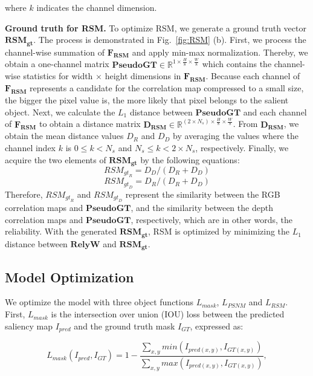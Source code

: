 \documentclass[runningheads]{llncs}
\begin{document}
	\noindent where $k$ indicates the channel dimension. 
	
	\noindent
	\textbf{Ground truth for RSM.} To optimize RSM, we generate a ground truth vector $\mathbf{RSM_{gt}}$. The process is demonstrated in Fig.~\ref{fig:RSM} (b). First, we process the channel-wise summation of $\mathbf{F_{RSM}}$ and apply min-max normalization. Thereby, we obtain a one-channel matrix $\mathbf{PseudoGT}\in \mathbb{R} ^ {1\times \frac{ H } { 8 } \times \frac{ W } { 8 }}$ which contains the channel-wise statistics for width $\times$ height dimensions in $\mathbf{F_{RSM}}$. Because each channel of $\mathbf{F_{RSM}}$ represents a candidate for the correlation map compressed to a small size, the bigger the pixel value is, the more likely that pixel belongs to the salient object. Next, we calculate the $L_1$ distance between $\mathbf{PseudoGT}$ and each channel of $\mathbf{F_{RSM}}$ to obtain a distance matrix $\mathbf{D_{RSM}} \in \mathbb{R} ^ {\left( 2\times N_s \right)\times \frac{ H } { 8 } \times \frac{ W } { 8 }}$. From $\mathbf{D_{RSM}}$, we obtain the mean distance values $D_R$ and $D_D$ by averaging the values where the channel index $k$ is $0 \leq k < N_s$ and $N_s \leq k < 2 \times N_s$, respectively. Finally, we acquire the two elements of $\mathbf{RSM_{gt}}$ by the following equations:
	\begin{equation}
		RSM_{{gt}_{R}} = D_D / (D_R+D_D)
	\end{equation}
	\begin{equation}
		RSM_{{gt}_{D}} = D_R / (D_R+D_D)
	\end{equation}
	Therefore, $RSM_{{gt}_{R}}$ and $RSM_{{gt}_{D}}$ represent the similarity between the RGB correlation maps and $\mathbf{PseudoGT}$, and the similarity between the depth correlation maps and $\mathbf{PseudoGT}$, respectively, which are in other words, the reliability. 
	With the generated $\mathbf{RSM_{gt}}$, RSM is optimized by minimizing the $L_1$ distance between $\mathbf{RelyW}$ and $\mathbf{RSM_{gt}}$.
	
	\subsection{Model Optimization}
	\label{Optimization}
	We optimize the model with three object functions $L_{mask}$, $L_{PSNM}$ and $L_{RSM}$. First, $L_{mask}$ is the intersection over union (IOU) loss between the predicted saliency map $I_{pred}$ and the ground truth mask $I_{GT}$, expressed as:
	
	\begin{equation}
		L _ { mask } \left ( I _ { pred } ,I _ { GT } \right ) =1- \frac{ \sum _ { x,y } ^ { } min \left ( I _ { pred \left ( x,y \right ) } ,I _ { GT \left ( x,y \right ) } \right ) } { \sum _ { x,y } ^ { } max \left ( I _ { pred \left ( x,y \right ) } ,I _ { GT \left ( x,y \right ) } \right ) },
	\end{equation}
	
\end{document}

